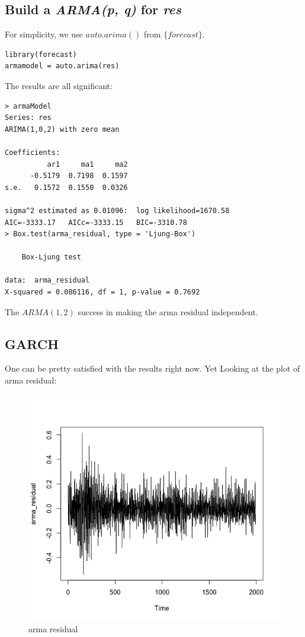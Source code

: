 \documentclass[a4paper, 11pt]{article}
\begin{document}
\subsection{Build a \textit{ARMA(p, q)} for \textit{res}}
For simplicity, we use $auto.arima()$ from $\{forecast\}$.
\begin{verbatim}
library(forecast)
armamodel = auto.arima(res)
\end{verbatim}
\indent The results are all significant:

\begin{verbatim}
> armaModel
Series: res 
ARIMA(1,0,2) with zero mean     

Coefficients:
          ar1     ma1     ma2
      -0.5179  0.7198  0.1597
s.e.   0.1572  0.1550  0.0326

sigma^2 estimated as 0.01096:  log likelihood=1670.58
AIC=-3333.17   AICc=-3333.15   BIC=-3310.78
> Box.test(arma_residual, type = 'Ljung-Box')

	Box-Ljung test

data:  arma_residual
X-squared = 0.086116, df = 1, p-value = 0.7692
\end{verbatim}

\indent The $ARMA(1, 2)$ success in making the arma residual independent. 



\subsection{GARCH}
One can be pretty satisfied with the results right now. Yet Looking at the plot of arma residual:
\begin{figure}[H]
\centering
\caption{arma residual}
\includegraphics[scale=.60]{armares.png}
\end{figure}
\end{document}
